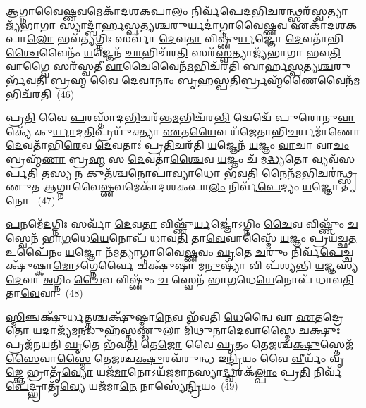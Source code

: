 {\anuvakamend[{𑌅\-\ul{𑌪𑌿} 𑌤𑍟 𑌸𑍍𑌯𑍁᳴𑌰𑍍𑌵𑍈𑌨𑍍𑌧 𑌭𑌵\-\ul{𑌤𑌿} 𑌚𑌤𑍁᳴𑌰𑍍𑌦𑌶 𑌚}]}%

\-\ul{𑌆}\-\-\ul{𑌗𑍍𑌨𑌾}\-\-\ul{𑌵𑍈}\-\-\ul{𑌷𑍍𑌣}\-𑌵𑌮𑍇𑌕𑌾᳴𑌦𑌶𑌕𑌪𑌾\-\ul{𑌲𑌂} 𑌨𑌿𑌰𑍍𑌵᳴𑌪𑍇𑌦\-\ul{𑌭𑌿}\-𑌚\-\ul{𑌰}\-𑌨𑍍𑌥𑍍𑌸𑌰᳴\-\ul{𑌸𑍍𑌵}\-𑌤𑍍𑌯𑌾𑌜𑍍𑌯᳴\-𑌭𑌾\-\ul{𑌗𑌾} 𑌸𑍍𑌯𑌾𑌦𑍍𑌬𑌾᳴𑌰𑍍\mbox{}𑌹\-\ul{𑌸𑍍𑌪}\-𑌤𑍍𑌯\-\ul{𑌶𑍍𑌚}\-𑌰𑍁𑌰𑍍𑌯𑌦𑌾॑𑌗𑍍𑌨𑌾𑌵𑍈\-\ul{𑌷𑍍𑌣}\-𑌵 𑌏𑌕𑌾᳴\-𑌦𑌶\-𑌕𑌪𑌾\-\ul{𑌲𑍋} 𑌭𑌵᳴\-\ul{𑌤𑍍𑌯}\-𑌗𑍍𑌨𑌿𑌃 𑌸𑌰𑍍𑌵𑌾᳴ \ul{𑌦𑍇}\-𑌵\-\ul{𑌤𑌾} 𑌵𑌿𑌷𑍍𑌣𑍁᳴\-\ul{𑌰𑍍𑌯}\-𑌜𑍍𑌞𑍋 \ul{𑌦𑍇}\-𑌵𑌤𑌾᳴𑌭𑌿\-\ul{𑌶𑍍𑌚𑍈}\-𑌵𑍈𑌨𑌂᳴ \ul{𑌯}\-𑌜𑍍𑌞𑍇𑌨᳴ \ul{𑌚𑌾}\-𑌭𑌿𑌚᳴𑌰\-\ul{𑌤𑌿} 𑌸𑌰᳴\-\ul{𑌸𑍍𑌵}\-𑌤𑍍𑌯𑌾𑌜𑍍𑌯᳴𑌭𑌾𑌗𑌾 𑌭𑌵\-\ul{𑌤𑌿} 𑌵𑌾𑌗𑍍𑌵𑍈 𑌸𑌰᳴𑌸𑍍𑌵𑌤𑍀 \ul{𑌵𑌾}\-𑌚𑍈𑌵𑍈𑌨᳴\-\ul{𑌮}\-𑌭𑌿𑌚᳴𑌰𑌤𑌿 𑌬𑌾𑌰𑍍\mbox{}𑌹\-\ul{𑌸𑍍𑌪}\-𑌤𑍍𑌯\-\ul{𑌶𑍍𑌚}\-𑌰𑍁𑌰𑍍𑌭᳴𑌵\-\ul{𑌤𑌿} 𑌬𑍍𑌰\-\ul{𑌹𑍍𑌮} 𑌵𑍈 \ul{𑌦𑍇}\-𑌵𑌾\-\ul{𑌨𑌾𑌂} 𑌬𑍃\-\ul{𑌹}\-𑌸𑍍𑌪\-\ul{𑌤𑌿}\-𑌰𑍍𑌬𑍍𑌰𑌹𑍍𑌮᳴\-\ul{𑌣𑍈}\-𑌵𑍈𑌨᳴\-\ul{𑌮}\-𑌭𑌿𑌚᳴𑌰\-\ul{𑌤𑌿}\-~(46)

𑌪𑍍𑌰\-\ul{𑌤𑌿} 𑌵𑍈 \ul{𑌪}\-𑌰𑌸𑍍𑌤𑌾᳴𑌦\-\ul{𑌭𑌿}\-𑌚𑌰᳴𑌨𑍍𑌤\-\ul{𑌮}\-𑌭𑌿𑌚᳴𑌰\-\ul{𑌨𑍍𑌤𑌿} 𑌦𑍍𑌵𑍇𑌦𑍍𑌵𑍇᳴ 𑌪𑍁𑌰𑍋𑌨𑍁\-\ul{𑌵𑌾}\-𑌕𑍍𑌯𑍇᳴ 𑌕𑍁\-\ul{𑌰𑍍𑌯𑌾}\-𑌦\-\ul{𑌤𑌿}\-𑌪𑍍𑌰𑌯𑍁᳴𑌕𑍍𑌤𑍍𑌯𑌾 \ul{𑌏}\-𑌤\-\ul{𑌯𑍈}\-𑌵 𑌯᳴𑌜𑍇𑌤𑌾𑌭𑌿\-\ul{𑌚}\-𑌰𑍍𑌯𑌮𑌾᳴𑌣𑍋 \ul{𑌦𑍇}\-𑌵𑌤𑌾᳴𑌭𑌿\-\ul{𑌰𑍇}\-𑌵 \ul{𑌦𑍇}\-𑌵𑌤𑌾𑌃॑ 𑌪𑍍𑌰\-\ul{𑌤𑌿}\-𑌚𑌰᳴𑌤𑌿 \ul{𑌯}\-𑌜𑍍𑌞𑍇𑌨᳴ \ul{𑌯}\-𑌜𑍍𑌞𑌂 \ul{𑌵𑌾}\-𑌚𑌾 𑌵𑌾\-\ul{𑌚𑌂} 𑌬𑍍𑌰𑌹𑍍𑌮᳴\-\ul{𑌣𑌾} 𑌬𑍍𑌰\-\ul{𑌹𑍍𑌮} 𑌸 \ul{𑌦𑍇}\-𑌵𑌤𑌾॑\-\ul{𑌶𑍍𑌚𑍈}\-𑌵 \ul{𑌯}\-𑌜𑍍𑌞𑌂 𑌚᳴ 𑌮\-\ul{𑌦𑍍𑌧𑍍𑌯}\-𑌤𑍋 𑌵𑍍𑌯𑌵᳴𑌸𑌰𑍍𑌪\-\ul{𑌤𑌿} 𑌤\-\ul{𑌸𑍍𑌯} 𑌨 𑌕𑍁𑌤᳴\-\ul{𑌶𑍍𑌚}\-𑌨𑍋𑌪𑌾॑\-\ul{𑌵𑍍𑌯𑌾}\-𑌧𑍋 𑌭᳴𑌵\-\ul{𑌤𑌿} 𑌨𑍈𑌨᳴𑌮\-\ul{𑌭𑌿}\-𑌚𑌰॑𑌨𑍍𑌥𑍍𑌸𑍍𑌤𑍃𑌣𑍁𑌤 𑌆𑌗𑍍𑌨𑌾𑌵𑍈\-\ul{𑌷𑍍𑌣}\-𑌵𑌮𑍇𑌕𑌾᳴\-𑌦𑌶\-𑌕𑌪𑌾\-\ul{𑌲𑌂} 𑌨𑌿𑌰𑍍𑌵᳴\-\ul{𑌪𑍇}\-𑌦𑍍𑌯𑌂 \ul{𑌯}\-𑌜𑍍𑌞𑍋 𑌨𑍋-~(47)

\-\ul{𑌪}\-𑌨𑌮𑍇᳴\-\ul{𑌦}\-𑌗𑍍𑌨𑌿𑌃 𑌸𑌰𑍍𑌵𑌾᳴ \ul{𑌦𑍇}\-𑌵\-\ul{𑌤𑌾} 𑌵𑌿𑌷𑍍𑌣𑍁᳴\-\ul{𑌰𑍍𑌯}\-𑌜𑍍𑌞𑍋॑\-𑌽𑌗𑍍𑌨𑌿𑌂 \ul{𑌚𑍈}\-𑌵 𑌵𑌿𑌷𑍍𑌣𑍁𑌂᳴ \ul{𑌚} 𑌸𑍍𑌵𑍇𑌨᳴ 𑌭𑌾\-\ul{𑌗}\-𑌧𑍇\-\ul{𑌯𑍇}\-𑌨𑍋𑌪᳴ 𑌧𑌾𑌵\-\ul{𑌤𑌿} 𑌤𑌾\-\ul{𑌵𑍇}\-𑌵𑌾𑌸𑍍𑌮𑍈᳴ \ul{𑌯}\-𑌜𑍍𑌞𑌂 𑌪𑍍𑌰𑌯᳴𑌚𑍍𑌛\-\ul{𑌤} 𑌉𑌪𑍈᳴𑌨𑌂 \ul{𑌯}\-𑌜𑍍𑌞𑍋 𑌨᳴𑌮𑌤𑍍𑌯𑌾𑌗𑍍𑌨𑌾𑌵𑍈\-\ul{𑌷𑍍𑌣}\-𑌵𑌂 \ul{𑌘𑍃}\-𑌤𑍇 \ul{𑌚}\-𑌰𑍁𑌂 𑌨𑌿𑌰𑍍𑌵᳴\-\ul{𑌪𑍇}\-𑌚𑍍𑌚𑌕𑍍𑌷𑍁᳴𑌷𑍍𑌕𑌾\-\ul{𑌮𑍋}\-\-𑌽𑌗𑍍𑌨𑍇𑌰𑍍𑌵𑍈 𑌚𑌕𑍍𑌷𑍁᳴𑌷𑌾 𑌮\-\ul{𑌨𑍁}\-𑌷𑍍𑌯𑌾᳴ 𑌵𑌿 𑌪᳴𑌶𑍍𑌯𑌨𑍍𑌤𑌿 \ul{𑌯}\-𑌜𑍍𑌞𑌸𑍍𑌯᳴ \ul{𑌦𑍇}\-𑌵𑌾 \ul{𑌅}\-𑌗𑍍𑌨𑌿𑌂 \ul{𑌚𑍈}\-𑌵 𑌵𑌿𑌷𑍍𑌣𑍁𑌂᳴ \ul{𑌚} 𑌸𑍍𑌵𑍇𑌨᳴ 𑌭𑌾\-\ul{𑌗}\-𑌧𑍇\-\ul{𑌯𑍇}\-𑌨𑍋𑌪᳴ 𑌧𑌾𑌵\-\ul{𑌤𑌿} 𑌤𑌾\-\ul{𑌵𑍇}\-𑌵𑌾-~(48)

\-\ul{𑌸𑍍𑌮𑌿}\-𑌞𑍍𑌚𑌕𑍍𑌷𑍁᳴𑌰𑍍𑌧\-\ul{𑌤𑍍𑌤}\-𑌶𑍍𑌚𑌕𑍍𑌷𑍁᳴𑌷𑍍𑌮𑌾\-\ul{𑌨𑍇}\-𑌵 𑌭᳴𑌵𑌤𑌿 \ul{𑌧𑍇}\-𑌨𑍍𑌵𑍈 𑌵𑌾 \ul{𑌏}\-𑌤𑌦𑍍𑌰𑍇\-\ul{𑌤𑍋} 𑌯𑌦𑌾𑌜𑍍𑌯᳴𑌮\-\ul{𑌨}\-𑌡𑍁𑌹᳴𑌸𑍍𑌤\-\ul{𑌣𑍍𑌡𑍁}\-𑌲𑌾 𑌮𑌿᳴\-\ul{𑌥𑍁}\-𑌨𑌾\-\ul{𑌦𑍇}\-𑌵𑌾\-\ul{𑌸𑍍𑌮𑍈} 𑌚\-\ul{𑌕𑍍𑌷𑍁𑌃} 𑌪𑍍𑌰𑌜᳴𑌨𑌯𑌤𑌿 \ul{𑌘𑍃}\-𑌤𑍇 𑌭᳴𑌵\-\ul{𑌤𑌿} 𑌤𑍇\-\ul{𑌜𑍋} 𑌵𑍈 \ul{𑌘𑍃}\-𑌤𑌂 𑌤𑍇\-\ul{𑌜}\-𑌶𑍍𑌚\-\ul{𑌕𑍍𑌷𑍁}\-𑌸𑍍𑌤𑍇𑌜᳴\-\ul{𑌸𑍈}\-𑌵𑌾\-\ul{𑌸𑍍𑌮𑍈} 𑌤𑍇\-\ul{𑌜}\-𑌶𑍍𑌚\-\ul{𑌕𑍍𑌷𑍁}\-𑌰𑌵᳴𑌰𑍁𑌨𑍍𑌧 𑌇\-\ul{𑌨𑍍𑌦𑍍𑌰𑌿}\-𑌯𑌂 𑌵𑍈 \ul{𑌵𑍀}\-𑌰𑍍𑌯𑌂᳴ 𑌵𑍃\-\ul{𑌙𑍍𑌕𑍍𑌤𑍇} 𑌭𑍍𑌰𑌾𑌤𑍃᳴\-\ul{𑌵𑍍𑌯𑍋} 𑌯𑌜᳴\-\ul{𑌮𑌾}\-𑌨𑍋\-𑌽𑌯᳴𑌜𑌮𑌾𑌨𑌸𑍍𑌯𑌾\-\ul{𑌦𑍍𑌧𑍍𑌵}\-𑌰𑌕᳴\-\ul{𑌲𑍍𑌪𑌾𑌂} 𑌪𑍍𑌰\-\ul{𑌤𑌿} 𑌨𑌿𑌰𑍍𑌵᳴\-\ul{𑌪𑍇}\-𑌦𑍍𑌭𑍍𑌰𑌾𑌤𑍃᳴\-\ul{𑌵𑍍𑌯𑍇} 𑌯𑌜᳴𑌮𑌾\-\ul{𑌨𑍇} 𑌨𑌾𑌸𑍍𑌯𑍇॑\-\ul{𑌨𑍍𑌦𑍍𑌰𑌿}\-𑌯𑌂~(49)


